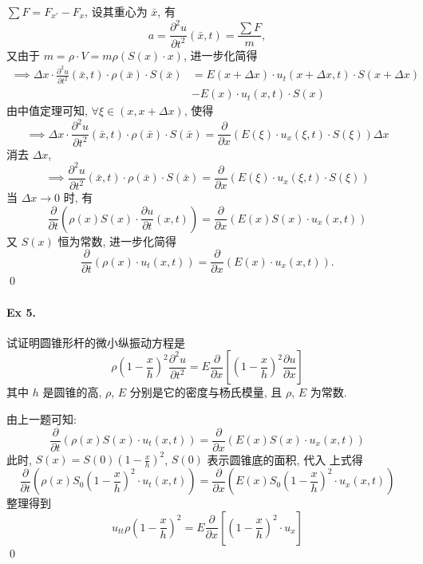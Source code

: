 $\sum F = F_{x'} - F_x$, 设其重心为 $\bar x$, 有
\[
a = \frac{\partial^2 u}{\partial t^2}(\bar x, t) = \frac{\sum F}{m},
\]
又由于 $m = \rho \cdot V = m \rho (S(x) \cdot x)$, 进一步化简得
\[ \begin{aligned}
\implies \Delta x \cdot \frac{\partial^2 u}{\partial t^2}(\bar x, t)
\cdot \rho(\bar x) \cdot S(\bar x)
&= E(x + \Delta x) \cdot u_t(x + \Delta x, t)\cdot S(x + \Delta x) \\
&- E(x) \cdot u_t(x, t) \cdot S(x)
\end{aligned} \]
由中值定理可知, $\forall \xi \in (x, x + \Delta x)$, 使得
\[
\implies \Delta x \cdot \frac{\partial^2 u}{\partial t^2}(\bar x, t)
\cdot \rho(\bar x) \cdot S(\bar x) =
\frac{\partial}{\partial x}\left(
  E(\xi) \cdot u_x(\xi, t) \cdot S(\xi)
\right) \Delta x
\]
消去 $\Delta x$,
\[
\implies \frac{\partial^2 u}{\partial t^2}(\bar x, t)
\cdot \rho(\bar x) \cdot S(\bar x) =
\frac{\partial}{\partial x}\left( E(\xi) \cdot u_x(\xi, t) \cdot S(\xi) \right)
\]
当 $\Delta x \to 0$ 时, 有
\[
\frac{\partial}{\partial t}\left(
  \rho(x)S(x) \cdot \frac{\partial u}{\partial t}(x, t)
\right) =
\frac{\partial}{\partial x}\left( E(x) S(x) \cdot u_x(x, t)\right)
\]
又 $S(x)$ 恒为常数, 进一步化简得
\[
\frac{\partial}{\partial t}\left( \rho(x)\cdot u_t(x, t) \right) =
\frac{\partial}{\partial x}\left( E(x) \cdot u_x(x, t) \right).
\]
\qed

\paragraph{Ex 5.}
试证明圆锥形杆的微小纵振动方程是
\[
\rho (1 - \frac{x}{h})^2 \frac{\partial^2 u}{\partial t^2}
= E \frac{\partial}{\partial x}
[(1 - \frac{x}{h})^2 \frac{\partial u}{\partial x} ]
\]
其中 $h$ 是圆锥的高, $\rho$, $E$ 分别是它的密度与杨氏模量, 且 $\rho$, $E$ 为常数.

\solution 由上一题可知:
\[
\frac{\partial}{\partial t}\left( \rho(x)S(x) \cdot u_t(x, t) \right) =
\frac{\partial}{\partial x}\left( E(x) S(x) \cdot u_x(x, t)\right)
\]
此时, $S(x) = S(0)\left(1 - \frac{x}{h}\right)^2$, $S(0)$ 表示圆锥底的面积, 代入
上式得
\[
\frac{\partial}{\partial t}\left(
  \rho(x) S_0\left(1 - \frac{x}{h}\right)^2 \cdot u_t(x, t)
\right) =
\frac{\partial}{\partial x}\left(
  E(x) S_0\left(1 - \frac{x}{h}\right)^2 \cdot u_x(x, t)
\right)
\]
整理得到
\[
u_{tt} \rho \left(1 - \frac{x}{h}\right)^2 =
E\frac{\partial}{\partial x}\left[
  \left(1 - \frac{x}{h}\right)^2 \cdot u_x
\right]
\]
\qed

